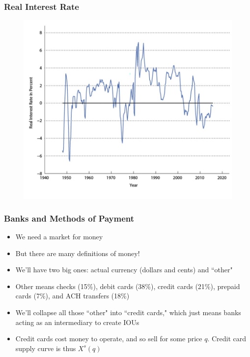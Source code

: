 \documentclass{beamer}
\begin{document}
\begin{frame}
\frametitle[alignment=center]{Real Interest Rate}
\begin{figure}
\centering
\includegraphics[scale=0.65]{Figures/W_Fig_12pt2.png}
\end{figure}
\end{frame}


\begin{frame}
\frametitle[alignment=center]{Banks and Methods of Payment}
\begin{itemize}
\item We need a market for money
\bigskip
\item But there are many definitions of money!
\bigskip
\item We'll have two big ones:  actual currency (dollars and cents) and ``other"
\bigskip
\item Other means checks (15\%), debit cards (38\%), credit cards (21\%), prepaid cards (7\%), and ACH transfers (18\%)
\bigskip
\item We'll collapse all those ``other" into ``credit cards," which just means banks acting as an intermediary to create IOUs
\bigskip
\item Credit cards cost money to operate, and so sell for some price $q$.  Credit card supply curve is thus $X^s(q)$
\end{itemize}
\end{frame}
\end{document}
